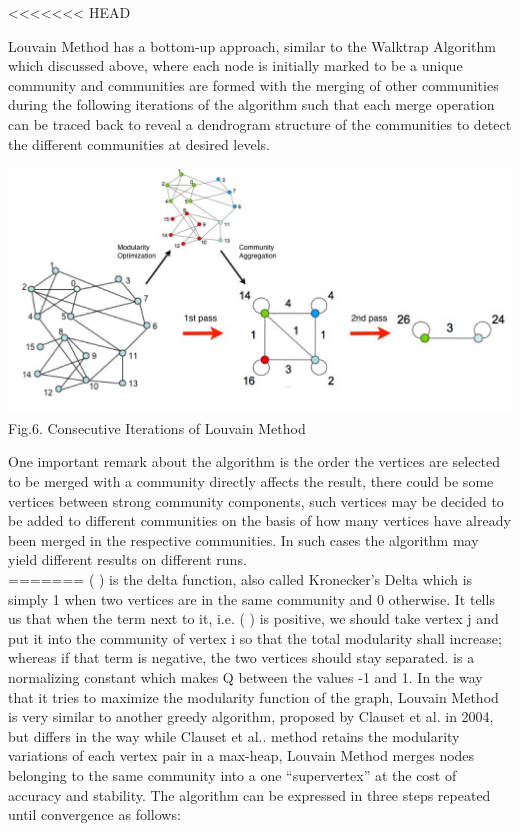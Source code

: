 \documentclass[10pt]{article}
\begin{document}
<<<<<<< HEAD

Louvain Method has a bottom-up approach, similar to the Walktrap Algorithm which discussed above, where each node is initially marked to be a unique community and communities are formed with the merging of other communities during the following iterations of the algorithm such that each merge operation can be traced back to reveal a dendrogram structure of the communities to detect the different communities at desired levels. \\

\begin{center}
    \includegraphics[scale=0.35]{louvain.jpg} \\
    Fig.6. Consecutive Iterations of Louvain Method\cite{blondel} \\
\end{center}

One important remark about the algorithm is the order the vertices are selected to be merged with a community directly affects the result, there could be some vertices between strong community components, such vertices may be decided to be added to different communities on the basis of how many vertices have already been merged in the respective communities. In such cases the algorithm may yield different results on different runs. \\
=======
( ) is the delta function, also called Kronecker’s Delta which is simply 1 when two vertices are
in the same community and 0 otherwise. It tells us that when the term next to it, i.e. ( ) is
positive, we should take vertex j and put it into the community of vertex i so that the total modularity shall increase; whereas if that term is negative, the two vertices should stay separated.
is a normalizing constant which makes Q between the values -1 and 1.
In the way that it tries to maximize the modularity function of the graph, Louvain Method is very similar to another greedy algorithm, proposed by Clauset et al. in 2004, but differs in the way while Clauset et al.\cite{clauset}. method retains the modularity variations of each vertex pair in a max-heap, Louvain Method merges nodes belonging to the same community into a one “supervertex” at the cost of accuracy and stability\cite{blondel}.
The algorithm can be expressed in three steps repeated until convergence as follows: \\
\end{document}
